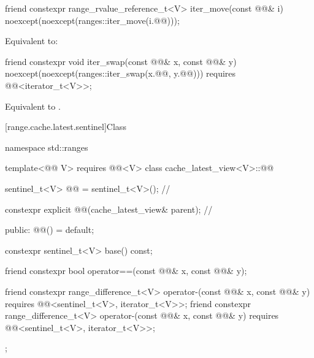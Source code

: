 %
\begin{itemdecl}
friend constexpr range_rvalue_reference_t<V> iter_move(const @@& i)
  noexcept(noexcept(ranges::iter_move(i.@@)));
\end{itemdecl}

\begin{itemdescr}
\pnum
\effects
Equivalent to: 
\end{itemdescr}

%
\begin{itemdecl}
friend constexpr void iter_swap(const @@& x, const @@& y)
  noexcept(noexcept(ranges::iter_swap(x.@@, y.@@)))
  requires @@<iterator_t<V>>;
\end{itemdecl}

\begin{itemdescr}
\pnum
\effects
Equivalent to
.
\end{itemdescr}

[range.cache.latest.sentinel]{Class }

%
\begin{codeblock}
namespace std::ranges {
  template<@@ V>
    requires @@<V>
  class cache_latest_view<V>::@@ {
    sentinel_t<V> @@ = sentinel_t<V>();                       // \expos

    constexpr explicit @@(cache_latest_view& parent);     // \expos

  public:
    @@() = default;

    constexpr sentinel_t<V> base() const;

    friend constexpr bool operator==(const @@& x, const @@& y);

    friend constexpr range_difference_t<V> operator-(const @@& x, const @@& y)
      requires @@<sentinel_t<V>, iterator_t<V>>;
    friend constexpr range_difference_t<V> operator-(const @@& x, const @@& y)
      requires @@<sentinel_t<V>, iterator_t<V>>;
  };
}
\end{codeblock}

